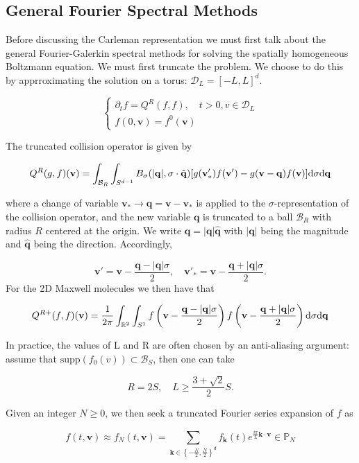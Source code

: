 \documentclass{article}
\def\t{\text}
\def\b{\mathbf}
\begin{document}
\subsection{General Fourier Spectral Methods}

Before discussing the Carleman representation we must first talk about the general Fourier-Galerkin spectral  methods for solving the spatially homogeneous Boltzmann equation. We must first truncate the problem. We choose to do this by apprroximating the solution on a torus: $\mathcal{D}_L = [-L,L]^d$.

\begin{equation} \label{eq:1}
    \begin{cases}
        \partial_t f = Q^R(f,f), \quad t > 0, v\in \mathcal{D}_L\\
        f(0, \b v) = f^0(\b v)
    \end{cases}
\end{equation}

The truncated collision operator is given by 

\[
    Q^R(g,f)(\b v) = \int_{\mathcal{B}_R} \int_{S^{d-1}} B_{\sigma}(|\b q|, \sigma \cdot \hat{\b q}) [ g(\b v'_*)f(\b v') - g(\b v-\b q)f(\b v)] \t d \sigma \t d \b q
\]

where a change of variable $\b v_* \to \b q = \b v - \b v_*$ is applied to the $\sigma$-representation of the collision operator, and the new variable $\b q$ is truncated to a ball $\mathcal{B}_R$ with radius $R$ centered at the origin. We write $\b q = |\b q|\hat{\b q}$ with $|\b q|$ being the magnitude and $\hat{\b q}$
being the direction. Accordingly,

\[
    \b v' = \b v - \frac{\b q - |\b q| \sigma}{2}, \quad \b v'_* = \b v - \frac{\b q + |\b q| \sigma}{2}.   
\]
For the 2D Maxwell molecules we then have that 

\[
    Q^{R+}(f,f)(\b v) = \frac{1}{2 \pi} \int_{\mathbb{R}^2} \int_{S^1} f \left( \b v - \frac{\b q - |\b q| \sigma}{2} \right) f \left( \b v - \frac{\b q + |\b q| \sigma}{2} \right) \t d \sigma \t d \b q
\]

In practice, the values of L and R are often chosen by an anti-aliasing argument: assume that $\text{supp}(f_0(v)) \subset \mathcal{B}_S$, then one can take

\[
    R = 2S, \quad L \geq \frac{3 + \sqrt{2}}{2} S.
\]

 Given an integer $N \geq 0$, we then seek a truncated Fourier series expansion of $f$ as

\[
    f(t,\b v) \approx f_N(t,\b v) = \sum_{\b k \in \left\{-\frac{N}{2}, \frac{N}{2}\right\}^d} f_{\b k}(t) e^{\frac{i \pi}{L} \b k \cdot \b v } \in \mathbb{P}_N
\]
\end{document}
